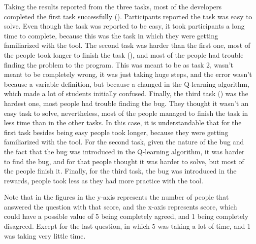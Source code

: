 Taking the results reported from the three tasks, most of the developers completed the first task successfully (). Participants reported the task was easy to solve. Even though the task was reported to be easy, it took participants a long time to complete, because this was the task in which they were getting familiarized with the 
tool. The second task was harder than the first one, most of the people took longer to finish the 
task (), and most of the people had trouble finding the problem to the program. 
This was meant to be as task 2, wasn't meant to be completely wrong, it was just taking huge 
steps, and the error wasn't because a variable definition, but because a changed in the Q-learning
algorithm, which made a lot of students initially confused. Finally, the third task () was the hardest 
one, most people had trouble finding the bug. They thought it wasn't an easy task to solve, 
nevertheless, most of the people managed to finish the task in less time than in the other tasks. 
In this case, it is understandable that for the first task besides being 
easy people took longer, because they were getting familiarized with the tool. For the second task,
given the nature of the bug and the fact that the bug was introduced in the Q-learning algorithm, 
it was harder to find the bug, and for that people thought it was harder to solve, but
most of the people finish it. Finally, for the third task, the bug was introduced in the rewards,
people took less as they had more practice with the tool.

Note that in the figures in  the y-axis represents the number of people 
that answered the question with that score, and the x-axis represents score, which could have a 
possible value of 5 being completely agreed, and 1 being completely disagreed. Except for the 
last question, in which 5 was taking a lot of time, and 1 was taking very little time.

